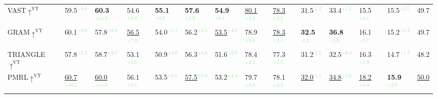 \begin{table}[t]
\begin{adjustbox}{width=\textwidth,center}
\begin{tabular}{@{}l|ll|ll|ll|ll|ll|ll|c@{}}
VAST$\uparrow^{\text{VT}}$  & 59.5\textcolor{lightgreen}{$^\text{+9.0}$}            & \textbf{60.3\textcolor{lightgreen}{$^\text{+11.3}$}}           & 54.6\textcolor{lightgreen}{$^\text{+6.0}$}           & \textbf{55.1\textcolor{lightgreen}{$^\text{+8.2}$}}           & \textbf{57.6\textcolor{lightgreen}{$^\text{+5.9}$}}           & \textbf{54.9}\textcolor{lightgreen}{$^\text{+6.1}$}           & \underline{80.1}\textcolor{lightgreen}{$^\text{+4.2}$}           & \underline{78.3}\textcolor{lightgreen}{$^\text{+3.5}$}           & 31.5\textcolor{lightgreen}{$^\text{-2.2}$}            & 33.4\textcolor{lightgreen}{$^\text{+1.2}$}            & 15.5\textcolor{lightgreen}{$^\text{+3.1}$}           & 15.5\textcolor{lightgreen}{$^\text{+2.5}$}           & 49.7\\
GRAM$\uparrow^{\text{VT}}$    & 60.1\textcolor{lightgreen}{$^\text{+9.6}$}            & 57.8\textcolor{lightgreen}{$^\text{+8.8}$}            & \underline{56.5}\textcolor{lightgreen}{$^\text{+7.9}$}           & 54.0\textcolor{lightgreen}{$^\text{+7.1}$}           & 56.2\textcolor{lightgreen}{$^\text{+4.5}$}           & \underline{53.5}\textcolor{lightgreen}{$^\text{+4.7}$}           & 78.9\textcolor{lightgreen}{$^\text{+3.0}$}           & \underline{78.3}\textcolor{lightgreen}{$^\text{+3.5}$}           & \textbf{32.5\textcolor{lightgreen}{$^\text{-1.2}$}}           & \textbf{36.8\textcolor{lightgreen}{$^\text{+4.6}$}}            & 16.1\textcolor{lightgreen}{$^\text{+3.7}$}            & 15.2\textcolor{lightgreen}{$^\text{+2.2}$}          & 49.7 \\
 TRIANGLE$\uparrow^{\text{VT}}$ & 57.8\textcolor{lightgreen}{$^\text{+7.3}$}           & 58.7\textcolor{lightgreen}{$^\text{+9.7}$}           & 53.1\textcolor{lightgreen}{$^\text{+4.5}$}           & 50.9\textcolor{lightgreen}{$^\text{+4.0}$}           & 56.3\textcolor{lightgreen}{$^\text{+4.6}$}           & 51.6\textcolor{lightgreen}{$^\text{+2.8}$}           & 78.4\textcolor{lightgreen}{$^\text{+2.5}$}           & 77.3\textcolor{lightgreen}{$^\text{+2.5}$}           & 31.2\textcolor{lightgreen}{$^\text{-2.5}$}           & 32.5\textcolor{lightgreen}{$^\text{+0.3}$}           & 16.3\textcolor{lightgreen}{$^\text{+3.9}$}           & 14.7\textcolor{lightgreen}{$^\text{+1.7}$}           & 48.2 \\
PMRL$\uparrow^{\text{VT}}$     & \underline{60.7}\textcolor{lightgreen}{$^\text{+10.2}$}          & \underline{60.0}\textcolor{lightgreen}{$^\text{+11.0}$}          & 56.1\textcolor{lightgreen}{$^\text{+7.5}$}           & 53.5\textcolor{lightgreen}{$^\text{+6.6}$}           & \underline{57.5}\textcolor{lightgreen}{$^\text{+5.8}$}           & 53.2\textcolor{lightgreen}{$^\text{+4.4}$}           & 79.7\textcolor{lightgreen}{$^\text{+3.8}$}           & 78.1\textcolor{lightgreen}{$^\text{+3.3}$}           & \underline{32.0}\textcolor{lightgreen}{$^\text{-1.7}$}           & \underline{34.8}\textcolor{lightgreen}{$^\text{+2.6}$}           & \underline{18.2}\textcolor{lightgreen}{$^\text{+5.8}$}           & \textbf{15.9}\textcolor{lightgreen}{$^\text{+2.9}$}         & \underline{50.0}  \\

\end{tabular}
\end{adjustbox}
\end{table}
